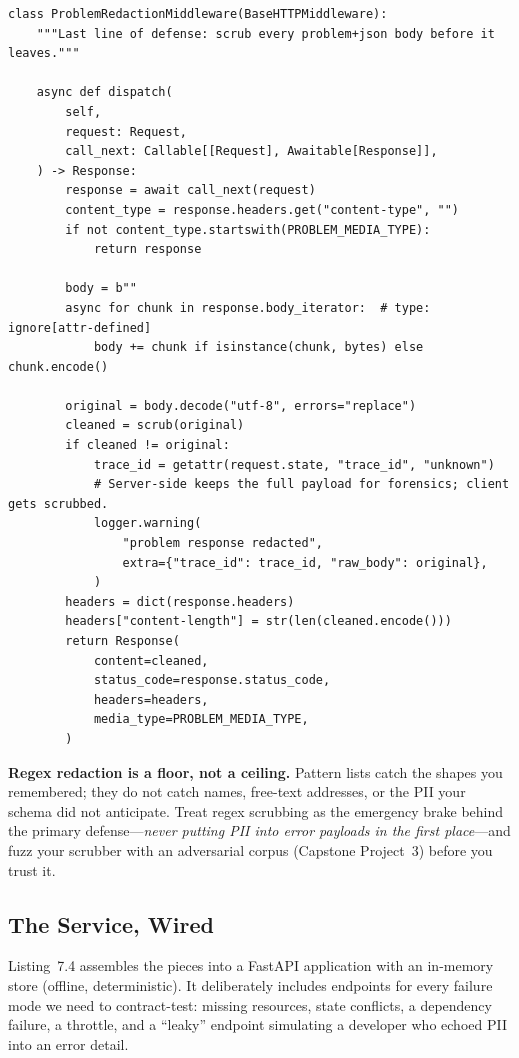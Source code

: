 \begin{verbatim}
class ProblemRedactionMiddleware(BaseHTTPMiddleware):
    """Last line of defense: scrub every problem+json body before it leaves."""

    async def dispatch(
        self,
        request: Request,
        call_next: Callable[[Request], Awaitable[Response]],
    ) -> Response:
        response = await call_next(request)
        content_type = response.headers.get("content-type", "")
        if not content_type.startswith(PROBLEM_MEDIA_TYPE):
            return response

        body = b""
        async for chunk in response.body_iterator:  # type: ignore[attr-defined]
            body += chunk if isinstance(chunk, bytes) else chunk.encode()

        original = body.decode("utf-8", errors="replace")
        cleaned = scrub(original)
        if cleaned != original:
            trace_id = getattr(request.state, "trace_id", "unknown")
            # Server-side keeps the full payload for forensics; client gets scrubbed.
            logger.warning(
                "problem response redacted",
                extra={"trace_id": trace_id, "raw_body": original},
            )
        headers = dict(response.headers)
        headers["content-length"] = str(len(cleaned.encode()))
        return Response(
            content=cleaned,
            status_code=response.status_code,
            headers=headers,
            media_type=PROBLEM_MEDIA_TYPE,
        )
\end{verbatim}

\begin{warningbox}
\textbf{Regex redaction is a floor, not a ceiling.} Pattern lists catch the
shapes you remembered; they do not catch names, free-text addresses, or the
PII your schema did not anticipate. Treat regex scrubbing as the emergency
brake behind the primary defense---\emph{never putting PII into error
payloads in the first place}---and fuzz your scrubber with an adversarial
corpus (Capstone Project~3) before you trust it.
\end{warningbox}

\subsection{The Service, Wired}

Listing~7.4 assembles the pieces into a FastAPI application with an
in-memory store (offline, deterministic). It deliberately includes endpoints
for every failure mode we need to contract-test: missing resources, state
conflicts, a dependency failure, a throttle, and a ``leaky'' endpoint
simulating a developer who echoed PII into an error detail.

